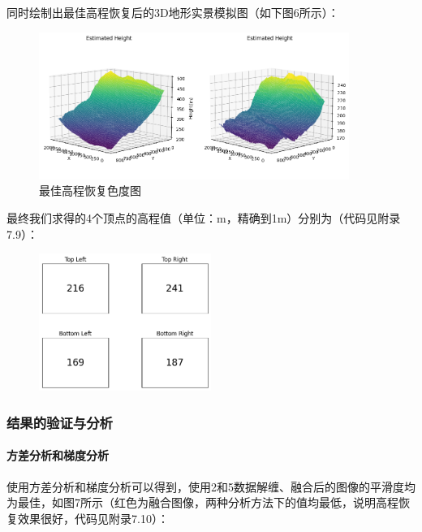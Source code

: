 \documentclass[a4paper]{article}
\begin{document}
	同时绘制出最佳高程恢复后的3D地形实景模拟图（如下图6所示）：\par

	\begin{figure}[H]
		\centering
		\includegraphics[width=0.9\textwidth]{t1/output3d_1_2.png}
		\caption{最佳高程恢复色度图}
		\label{fig:best_height}
	\end{figure}
	
	最终我们求得的4个顶点的高程值（单位：m，精确到1m）分别为（代码见附录7.9）：\par

	\begin{figure}[H]
		\centering
		\includegraphics[width=0.5\textwidth]{t1/output_1_1.png}
		\label{fig:4corner}
	\end{figure}

	\subsubsection{结果的验证与分析}

	\paragraph{方差分析和梯度分析}
	使用方差分析和梯度分析可以得到，使用2和5数据解缠、融合后的图像的平滑度均为最佳，如图7所示（红色为融合图像，两种分析方法下的值均最低，说明高程恢复效果很好，代码见附录7.10）：\par
\end{document}
